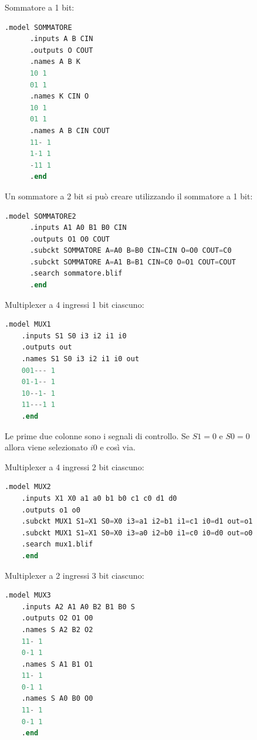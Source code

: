 \documentclass[a4paper]{article}
\theoremstyle{break}
\theoremstyle{break}
\theoremstyle{break}
\theoremstyle{break}
\begin{document}
\begin{figure}[H]
  \begin{example}
    Sommatore a 1 bit:
    \begin{lstlisting}[language=Verilog]
      .model SOMMATORE
      .inputs A B CIN
      .outputs O COUT
      .names A B K
      10 1
      01 1
      .names K CIN O
      10 1
      01 1
      .names A B CIN COUT
      11- 1
      1-1 1
      -11 1
      .end
    \end{lstlisting}
    Un sommatore a 2 bit si può creare utilizzando il sommatore a 1 bit:
    \begin{lstlisting}[language=Verilog]
      .model SOMMATORE2
      .inputs A1 A0 B1 B0 CIN
      .outputs O1 O0 COUT
      .subckt SOMMATORE A=A0 B=B0 CIN=CIN O=O0 COUT=C0
      .subckt SOMMATORE A=A1 B=B1 CIN=C0 O=O1 COUT=COUT
      .search sommatore.blif
      .end
    \end{lstlisting}
  \end{example}
\end{figure}
\begin{figure}[H]
  \begin{example}
    Multiplexer a 4 ingressi 1 bit ciascuno:
    \begin{lstlisting}[language=Verilog]
    .model MUX1
    .inputs S1 S0 i3 i2 i1 i0
    .outputs out
    .names S1 S0 i3 i2 i1 i0 out
    001--- 1
    01-1-- 1
    10--1- 1
    11---1 1
    .end
    \end{lstlisting}
    Le prime due colonne sono i segnali di controllo. Se \( S1=0 \) e \( S0=0 \) allora
    viene selezionato \( i0 \) e così via. 

    Multiplexer a 4 ingressi 2 bit ciascuno:
    \begin{lstlisting}[language=Verilog]
    .model MUX2
    .inputs X1 X0 a1 a0 b1 b0 c1 c0 d1 d0
    .outputs o1 o0
    .subckt MUX1 S1=X1 S0=X0 i3=a1 i2=b1 i1=c1 i0=d1 out=o1
    .subckt MUX1 S1=X1 S0=X0 i3=a0 i2=b0 i1=c0 i0=d0 out=o0
    .search mux1.blif
    .end
    \end{lstlisting}
  \end{example}
\end{figure}
\begin{figure}[H]
  \begin{example}
    Multiplexer a 2 ingressi 3 bit ciascuno:
    \begin{lstlisting}[language=Verilog]
    .model MUX3
    .inputs A2 A1 A0 B2 B1 B0 S
    .outputs O2 O1 O0
    .names S A2 B2 O2
    11- 1
    0-1 1
    .names S A1 B1 O1
    11- 1
    0-1 1
    .names S A0 B0 O0
    11- 1
    0-1 1
    .end
    \end{lstlisting}
  \end{example}
\end{figure}
\end{document}
